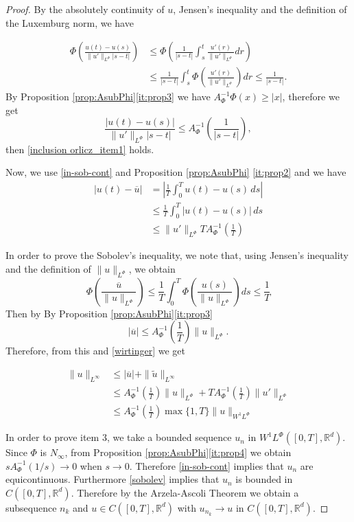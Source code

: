 \documentclass[twoside]{article}
\theoremstyle{remark}
\newcommand{\orlnor}{\|_{L^{\Phi}}}
\newcommand{\linf}{\|_{L^{\infty}}}
\newcommand{\lphi}{L^{\Phi}}
\newcommand{\wphi}{W^{1}\lphi}
\newcommand{\sobnor}{\|_{W^{1}\lphi}}
\newcommand{\rr}{\mathbb{R}}
\renewcommand{\leq}{\leqslant}
\renewcommand{\geq}{\geqslant}
\begin{document}
\begin{proof} By the absolutely continuity of $u$, Jensen's inequality and the definition of 
the Luxemburg norm, we have

\[
 \begin{split}
    \Phi\left( \frac{u(t)-u(s)}{\|u'\orlnor |s-t|}\right) &\leq  \Phi\left( \frac{1}{ |s-t|}\int_s^t  \frac{u'(r)}{\|u'\orlnor }dr\right)\\
    &\leq   \frac{1}{ |s-t|}\int_s^t  \Phi\left(\frac{u'(r)}{\|u'\orlnor }\right)dr
    \leq \frac{1}{ |s-t|}.
 \end{split}
\]
By Proposition \ref{prop:AsubPhi}\eqref{it:prop3}  we have $A^{-1}_{\Phi}\Phi(x)\geq |x|$, therefore we get
\[
    \frac{|u(t)-u(s)|}{\|u'\orlnor |s-t|} 
    \leq  A_{\Phi}^{-1}\left(\frac{1}{ |s-t|}\right),
\]
then  \ref{inclusion orlicz_item1} holds.

Now, we use \ref{in-sob-cont} and  Proposition \ref{prop:AsubPhi} \eqref{it:prop2} and we have 
\[\begin{split}
\left|u(t)-\overline {u}\right|&=
\left|\frac{1}{T}\int_0^T u(t)-u(s)\,ds\right|
\\
&\leq \frac{1}{T} \int_0^T |u(t)-u(s)|\,ds
\\
&\leq \|u'\orlnor T A_{\Phi}^{-1}\left(\frac{1}{T}\right)
\end{split}
\] 

In order to prove the Sobolev's inequality, we note that, using Jensen's inequality and 
the definition of $\|u\orlnor$, we obtain
\[ \Phi\left( \frac{ \overline{u}}{\|u\orlnor} \right) \leq
\frac{1}{T}\int_0^T\Phi\left(\frac{u(s)}{\|u\orlnor}\right)ds\leq\frac{1}{T}
\]
Then  by By Proposition \ref{prop:AsubPhi}\eqref{it:prop3} 
\[|\overline{u}|\leq A_{\Phi}^{-1}\left(\frac{1}{T}\right) \|u\orlnor.\]
Therefore, from this and \eqref{wirtinger} we get

\[\begin{split}
 \|u\linf &\leq |\overline{u}|+\|\tilde{u}\linf\\
 &\leq  
 A_{\Phi}^{-1}\left(\frac{1}{T}\right) \|u\orlnor+T A_{\Phi}^{-1}\left(\frac{1}{T}\right)\|u'\orlnor\\
 &\leq A_{\Phi}^{-1}\left(\frac{1}{T}\right)\max\{1,T\}\|u\sobnor
 \end{split}
 \]
 



In order to prove item 3, we take a bounded sequence
$u_n$ in $\wphi([0,T],\rr^d)$. Since $\Phi$ is $N_{\infty}$, from Proposition \ref{prop:AsubPhi}\eqref{it:prop4}  we obtain $sA_{\Phi}^{-1}(1/s)\to 0$ when $s\to 0$. Therefore \eqref{in-sob-cont} implies that $u_n$ are equicontinuous. Furthermore \eqref{sobolev} implies that $u_n$ is bounded in $C([0,T],\rr^d)$. Therefore by the Arzela-Ascoli Theorem we  obtain a subsequence $n_k$ and  $u\in C([0,T],\rr^d)$ with $u_{n_k}\to u$ in $C([0,T],\rr^d)$.

\end{proof}
\end{document}
